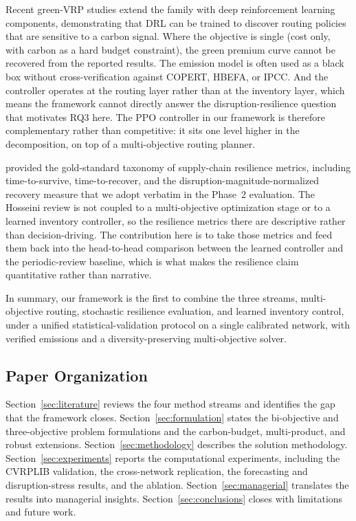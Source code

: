 \documentclass[review,preprint,authoryear,12pt]{elsarticle}
\begin{document}
Recent green-VRP studies extend the family with deep reinforcement
learning components, demonstrating that DRL can be trained to discover
routing policies that are sensitive to a carbon signal. Where the
objective is single (cost only, with carbon as a hard budget
constraint), the green premium curve cannot be recovered from the
reported results. The emission model is often used as a black box
without cross-verification against COPERT, HBEFA, or IPCC. And the
controller operates at the routing layer rather than at the inventory
layer, which means the framework cannot directly answer the
disruption-resilience question that motivates RQ3 here. The PPO
controller in our framework is therefore complementary rather than
competitive: it sits one level higher in the decomposition, on top of
a multi-objective routing planner.

\citet{hosseini2019review} provided the gold-standard taxonomy of
supply-chain resilience metrics, including time-to-survive,
time-to-recover, and the disruption-magnitude-normalized recovery
measure that we adopt verbatim in the Phase~2 evaluation. The Hosseini
review is not coupled to a multi-objective optimization stage or to a
learned inventory controller, so the resilience metrics there are
descriptive rather than decision-driving. The contribution here is to
take those metrics and feed them back into the head-to-head comparison
between the learned controller and the periodic-review baseline,
which is what makes the resilience claim quantitative rather than
narrative.

In summary, our framework is the first to combine the three streams,
multi-objective routing, stochastic resilience evaluation, and learned
inventory control, under a unified statistical-validation protocol on
a single calibrated network, with verified emissions and a
diversity-preserving multi-objective solver.

\subsection{Paper Organization}

Section~\ref{sec:literature} reviews the four method streams and
identifies the gap that the framework closes.
Section~\ref{sec:formulation} states the bi-objective and
three-objective problem formulations and the carbon-budget,
multi-product, and robust extensions.
Section~\ref{sec:methodology} describes the solution methodology.
Section~\ref{sec:experiments} reports the computational experiments,
including the CVRPLIB validation, the cross-network replication, the
forecasting and disruption-stress results, and the ablation.
Section~\ref{sec:managerial} translates the results into managerial
insights. Section~\ref{sec:conclusions} closes with limitations and
future work.
\end{document}

